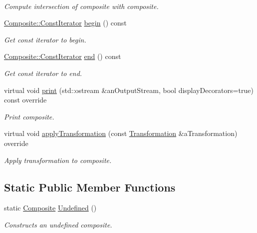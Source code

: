 \begin{DoxyCompactItemize}
$$\begin{DoxyCompactList}\small\item\em Compute intersection of composite with composite. \end{DoxyCompactList}\item 
\hyperlink{classlibrary_1_1math_1_1geom_1_1d3_1_1objects_1_1_composite_a52745f3c676ff98e099683b978253fc5}{Composite\+::\+Const\+Iterator} \hyperlink{classlibrary_1_1math_1_1geom_1_1d3_1_1objects_1_1_composite_ad2225ca4b70ef899e6bdd7ff7296c1d8}{begin} () const
\begin{DoxyCompactList}\small\item\em Get const iterator to begin. \end{DoxyCompactList}\item 
\hyperlink{classlibrary_1_1math_1_1geom_1_1d3_1_1objects_1_1_composite_a52745f3c676ff98e099683b978253fc5}{Composite\+::\+Const\+Iterator} \hyperlink{classlibrary_1_1math_1_1geom_1_1d3_1_1objects_1_1_composite_a17eb00b99b53fe9a483b05d7d4ef24aa}{end} () const
\begin{DoxyCompactList}\small\item\em Get const iterator to end. \end{DoxyCompactList}\item 
virtual void \hyperlink{classlibrary_1_1math_1_1geom_1_1d3_1_1objects_1_1_composite_adf6e594a816e509f7e85d51c84255236}{print} (std\+::ostream \&an\+Output\+Stream, bool display\+Decorators=true) const override
\begin{DoxyCompactList}\small\item\em Print composite. \end{DoxyCompactList}\item 
virtual void \hyperlink{classlibrary_1_1math_1_1geom_1_1d3_1_1objects_1_1_composite_a607850ccaeaea1dcd0cc57f986bea243}{apply\+Transformation} (const \hyperlink{classlibrary_1_1math_1_1geom_1_1d3_1_1_transformation}{Transformation} \&a\+Transformation) override
\begin{DoxyCompactList}\small\item\em Apply transformation to composite. \end{DoxyCompactList}\end{DoxyCompactItemize}
\subsection*{Static Public Member Functions}
\begin{DoxyCompactItemize}
\item 
static \hyperlink{classlibrary_1_1math_1_1geom_1_1d3_1_1objects_1_1_composite}{Composite} \hyperlink{classlibrary_1_1math_1_1geom_1_1d3_1_1objects_1_1_composite_a333ecb6ef3b6569330272d51eec83a01}{Undefined} ()
\begin{DoxyCompactList}\small\item\em Constructs an undefined composite. \end{DoxyCompactList}\end{DoxyCompactItemize}


